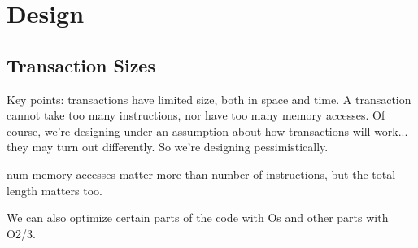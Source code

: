 \section{Design}


\subsection{Transaction Sizes}

Key points: transactions have limited size, both in space and time. A
transaction cannot take too many instructions, nor have too many memory
accesses. Of course, we're designing under an assumption about how transactions
will work... they may turn out differently. So we're designing pessimistically.

num memory accesses matter more than number of instructions, but the total length
matters too.

We can also optimize certain parts of the code with Os and other parts with
O2/3.
